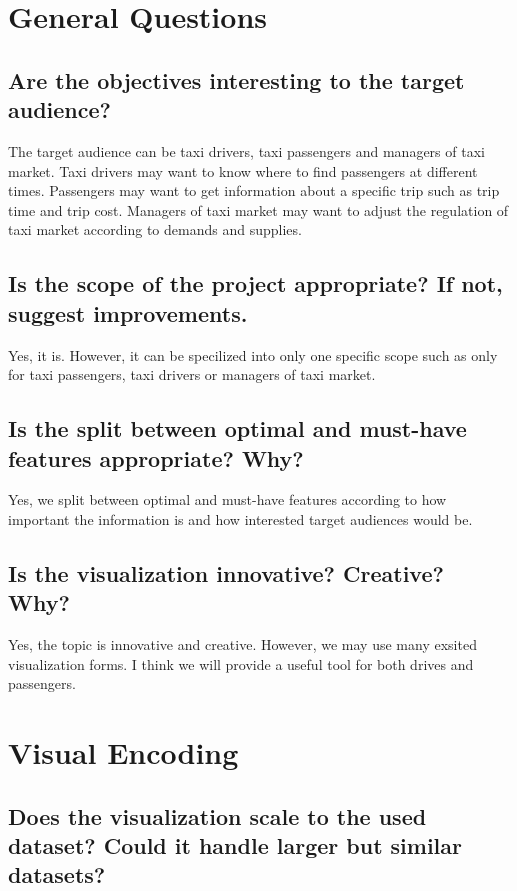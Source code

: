 \documentclass{article}
\begin{document}
    \section{General Questions}

    \subsection{Are the objectives interesting to the target audience?}

    The target audience can be taxi drivers, taxi passengers and managers of taxi market. Taxi drivers may want to know where to find 
    passengers at different times. Passengers may want to get information about a specific trip such as trip time and trip cost. Managers
    of taxi market may want to adjust the regulation of taxi market according to demands and supplies. 

    \subsection{Is the scope of the project appropriate? If not, suggest improvements.}

    Yes, it is. However, it can be specilized into only one specific scope such as only for taxi passengers, taxi drivers or managers of taxi market. 

    \subsection{Is the split between optimal and must-have features appropriate? Why?}

    Yes, we split between optimal and must-have features according to how important the information is and how interested target audiences would be.

    \subsection{Is the visualization innovative? Creative? Why?}

    Yes, the topic is innovative and creative. However, we may use many exsited visualization forms. I think we will provide a useful tool for both drives and passengers.

    \section{Visual Encoding}

    \subsection{Does the visualization scale to the used dataset? Could it handle larger but similar datasets?}
\end{document}

